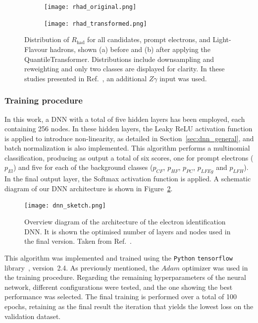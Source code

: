 \begin{figure}[htbp]
  \centering
  \begin{subfigure}[b]{0.49\textwidth}
      \texttt{[image: rhad\_original.png]}
      \caption{}
  \end{subfigure}
  \hfill
  \begin{subfigure}[b]{0.49\textwidth}
      \texttt{[image: rhad\_transformed.png]}
      \caption{}
  \end{subfigure}
  \hfill
  \caption{Distribution of $R_{\text{had}}$ for all candidates, prompt electrons, and Light-Flavour hadrons, shown (a) before and (b) after applying the QuantileTransformer. Distributions include downsampling and reweighting and only two classes are displayed for clarity. In these studies presented in Ref.~\cite{dnn_paper}, an additional $Z\gamma$ input was used.}
  \label{fig:transformed}
\end{figure}

\subsubsection{Training procedure}

In this work, a DNN with a total of five hidden layers has been employed, each containing 256 nodes. In these hidden layers, the Leaky ReLU activation function is applied to introduce non-linearity, as detailed in Section~\ref{sec:dnn_general}, and batch normalization is also implemented.  
This algorithm performs a multinomial classification, producing as output a total of six scores, one for prompt electrons ($p_{El}$) and five for each of the background classes ($p_{CF}$, $p_{HF}$, $p_{PC}$, $p_{LFEg}$ and $p_{LFH}$). In the final output layer, the Softmax activation function is applied.  
A schematic diagram of our DNN architecture is shown in Figure~\ref{dnn_sketch}.

\begin{figure}[htbp]
  \centering
  \texttt{[image: dnn\_sketch.png]}
  \caption{Overview diagram of the architecture of the electron identification DNN. It is shown the optimised number of layers and nodes used in the final version. Taken from Ref.~\cite{dnn_paper}.}
  \label{dnn_sketch}
\end{figure}

This algorithm was implemented and trained using the \texttt{Python} \texttt{tensorflow} library~\cite{tensorflow2015}, version~2.4. As previously mentioned, the $Adam$ optimizer was used in the training procedure. Regarding the remaining hyperparameters of the neural network, different configurations were tested, and the one showing the best performance was selected.  
The final training is performed over a total of 100 epochs, retaining as the final result the iteration that yields the lowest loss on the validation dataset.

